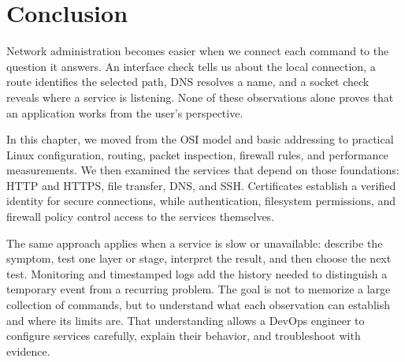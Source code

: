 \documentclass[journal]{IEEEtran}
\begin{document}
\section{Conclusion}
Network administration becomes easier when we connect each command to the question it answers. An interface check tells us about the local connection, a route identifies the selected path, DNS resolves a name, and a socket check reveals where a service is listening. None of these observations alone proves that an application works from the user's perspective.

In this chapter, we moved from the OSI model and basic addressing to practical Linux configuration, routing, packet inspection, firewall rules, and performance measurements. We then examined the services that depend on those foundations: HTTP and HTTPS, file transfer, DNS, and SSH. Certificates establish a verified identity for secure connections, while authentication, filesystem permissions, and firewall policy control access to the services themselves.

The same approach applies when a service is slow or unavailable: describe the symptom, test one layer or stage, interpret the result, and then choose the next test. Monitoring and timestamped logs add the history needed to distinguish a temporary event from a recurring problem. The goal is not to memorize a large collection of commands, but to understand what each observation can establish and where its limits are. That understanding allows a DevOps engineer to configure services carefully, explain their behavior, and troubleshoot with evidence.



\end{document}
